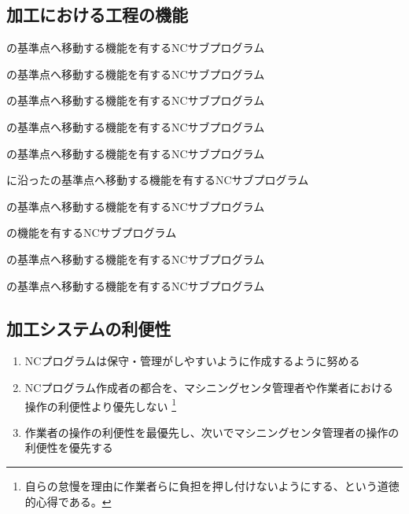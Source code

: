 \subsection{加工における工程の機能}
\begin{enumerate}[label={\sarrow[red]}]
\item \EndFacecutMilling の基準点へ移動する機能を有するNCサブプログラム
\item \OutcutMilling の基準点へ移動する機能を有するNCサブプログラム
\item[\sarrow] \CurvedOutcutMilling の基準点へ移動する機能を有するNCサブプログラム
\item \KeywayMilling の基準点へ移動する機能を有するNCサブプログラム
\item \EndFaceOutCChamferMilling の基準点へ移動する機能を有するNCサブプログラム
\item[\sarrow] \CurvedOutcut に沿った\EndFaceOutCChamferMilling の基準点へ移動する機能を有するNCサブプログラム
\item \EndFaceInCChamferMilling の基準点へ移動する機能を有するNCサブプログラム
\item \DimpleMilling の機能を有するNCサブプログラム
\item[\sarrow] \EndFaceBoringMilling の基準点へ移動する機能を有するNCサブプログラム
\item[\sarrow] \IncutBoringMilling の基準点へ移動する機能を有するNCサブプログラム
\end{enumerate}



\clearpage


\subsection{加工システムの利便性}
\begin{enumerate}[label=\alph*)]
\item {}NCプログラムは保守・管理がしやすいように作成するように努める
\item {}NCプログラム作成者の都合を、マシニングセンタ管理者や作業者における操作の利便性より優先しない
\footnote{自らの怠慢を理由に作業者らに負担を押し付けないようにする、という道徳的心得である。}
\item 作業者の操作の利便性を最優先し、次いでマシニングセンタ管理者の操作の利便性を優先する
\end{enumerate}


